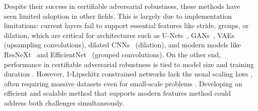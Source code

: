 \noindent Despite their success in certifiable adversarial robustness, these methods have seen limited adoption in other fields. This is largely due to implementation limitations: current layers fail to support essential features like stride, groups, or dilation, which are critical for architectures such as U-Nets~\cite{ronneberger2015u}, GANs~\cite{goodfellow2014generative}, VAEs~\cite{kingma2013auto} (upsampling convolutions), dilated CNNs~\cite{li2018csrnet} (dilation), and modern models like ResNeXt~\cite{xie2017aggregated} and EfficientNet~\cite{tan2019efficientnet} (grouped convolutions).  On the other end, performance in certifiable adversarial robustness is tied to model size and training duration \cite{prach_1-lipschitz_2023}. However, 1-Lipschitz constrained networks lack the usual scaling laws \cite{prach2024intriguing}, often requiring massive datasets even for small-scale problems \cite{hu_recipe_2023}. Developing an efficient and scalable method that supports modern features method could address both challenges simultaneously.


